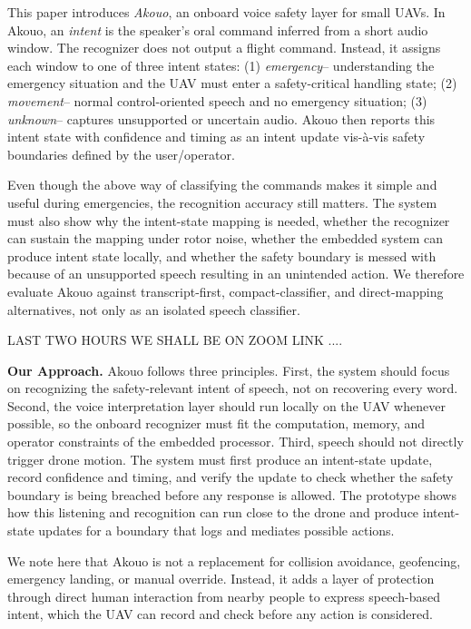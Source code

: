 
This paper introduces \emph{Akouo}, an onboard voice safety layer for small UAVs. In Akouo, an \emph{intent} is the speaker's oral command inferred from a short audio window. The recognizer does not output a flight command. Instead, it assigns each window to one of three intent states: (1) \emph{emergency}-- understanding the emergency situation and the UAV must enter a safety-critical handling state; (2) \emph{movement}-- normal control-oriented speech and no emergency situation; (3) \emph{unknown}-- captures unsupported or uncertain audio. Akouo then reports this intent state with confidence and timing as an intent update vis-\`a-vis safety boundaries defined by the user/operator.

Even though the above way of classifying the commands makes it simple and useful during emergencies, the recognition accuracy still matters. The system must also show why the intent-state mapping is needed, whether the recognizer can sustain the mapping under rotor noise, whether the embedded \sys{} system can produce intent state locally, and whether the safety boundary is messed with because of an unsupported speech resulting in an unintended action. We therefore evaluate Akouo against transcript-first, compact-classifier, and direct-mapping alternatives, not only as an isolated speech classifier.

LAST TWO HOURS WE SHALL BE ON ZOOM LINK ....

\textbf{Our Approach.} Akouo follows three principles. First, the system should focus on recognizing the safety-relevant intent of speech, not on recovering every word. Second, the voice interpretation layer should run locally on the UAV whenever possible, so the onboard recognizer must fit the computation, memory, and operator constraints of the embedded processor. Third, speech should not directly trigger drone motion. The system must first produce an intent-state update, record confidence and timing, and verify the update to check whether the safety boundary is being breached before any response is allowed.
The prototype shows how this listening and recognition can run close to the drone and produce intent-state updates for a boundary that logs and mediates possible actions.

We note here that Akouo is not a replacement for collision avoidance, geofencing, emergency landing, or manual override. Instead, it adds a layer of protection through direct human interaction from nearby people to express speech-based intent, which the UAV can record and check before any action is considered.

